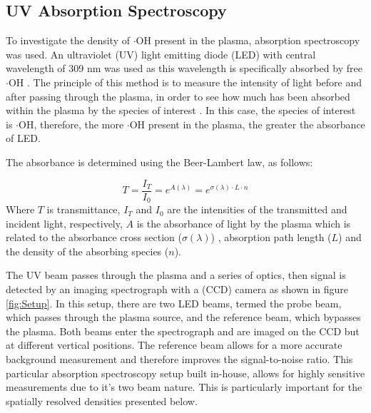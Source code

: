\documentclass[11pt, oneside]{article}   	%
\begin{document}
\subsection{UV Absorption Spectroscopy} \label{sec:AbsorptionSpec}

To investigate the density of $\cdot$OH present in the plasma, absorption spectroscopy was used. An ultraviolet (UV) light emitting diode (LED) with central wavelength of 309 nm was used as this wavelength is specifically absorbed by free $\cdot$OH \cite{Hatano2010}.
The principle of this method is to measure the intensity of light before and after passing through the plasma, in order to see how much has been absorbed within the plasma by the species of interest \cite{Reuter2015}.
In this case, the species of interest is $\cdot$OH, therefore, the more $\cdot$OH present in the plasma, the greater the absorbance of LED.

The absorbance is determined using the Beer-Lambert law, as follows:

\begin{equation} \label{eqn:Transmittance}
    T= \frac{I_T}{I_0} = e^{A(\lambda)} = e^{\sigma(\lambda) \cdot L \cdot n}
\end{equation}
Where $T$ is transmittance, $I_T$ and $I_0$ are the intensities of the transmitted and incident light, respectively, $A$ is the absorbance of light by the plasma which is related to the absorbance cross section ($\sigma(\lambda)$) \cite{DornNH1995}, absorption path length ($L$) and the density of the absorbing species ($n$).

The UV beam passes through the plasma and a series of optics, then signal is detected by an imaging spectrograph with a (CCD) camera as shown in figure \ref{fig:Setup}. 
In this setup, there are two LED beams, termed the probe beam, which passes through the plasma source, and the reference beam, which bypasses the plasma.
Both beams enter the spectrograph and are imaged on the CCD but at different vertical positions.
The reference beam allows for a more accurate background measurement and therefore improves the signal-to-noise ratio.
This particular absorption spectroscopy setup built in-house, allows for highly sensitive measurements due to it's two beam nature.
This is particularly important for the spatially resolved densities presented below.
\end{document}
